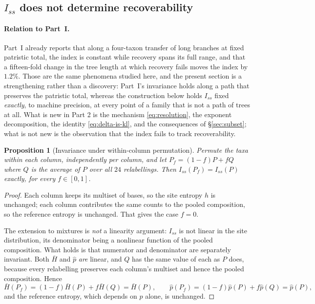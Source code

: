 \documentclass[preprint,12pt,authoryear]{elsarticle}
\newcommand{\Iss}{I_{ss}}
\newcommand{\Hbar}{\bar H}
\newtheorem{proposition}[theorem]{Proposition}
\theoremstyle{definition}
\theoremstyle{remark}
\begin{document}
\subsection{$\Iss$ does not determine recoverability}
\label{sec:shuffle}

\paragraph{Relation to Part~I.} Part~I
\citep{xu2026preprint} already reports that along a four-taxon transfer of
long branches at fixed patristic total, the index is constant while recovery
spans its full range, and that a fifteen-fold change in the tree length at
which recovery fails moves the index by $1.2\%$. Those are the same
phenomena studied here, and the present section is a strengthening rather
than a discovery: Part~I's invariance holds along a path that
preserves the patristic total, whereas the construction below holds $\Iss$
fixed \emph{exactly}, to machine precision, at every point of a family that
is not a path of trees at all. What is new in Part 2 is the mechanism
\eqref{eq:resolution}, the exponent decomposition, the identity
\eqref{eq:delta-is-kl}, and the consequences of \S\ref{sec:subset}; what is
not new is the observation that the index fails to track recoverability.

\begin{proposition}[Invariance under within-column permutation]
\label{prop:shuffle}
Permute the taxa \emph{within each column}, independently per column, and let
$P_f=(1-f)P+fQ$ where $Q$ is the average of $P$ over all $24$ relabellings.
Then $\Iss(P_f)=\Iss(P)$ exactly, for every $f\in[0,1]$.
\end{proposition}

\begin{proof}
Each column keeps its multiset of bases, so the site entropy $h$ is unchanged;
each column contributes the same counts to the pooled composition, so the
reference entropy is unchanged. That gives the case $f=0$.

The extension to mixtures is \emph{not} a linearity argument: $\Iss$ is not
linear in the site distribution, its denominator being a nonlinear function of
the pooled composition. What holds is that numerator and denominator are
separately invariant. Both $\Hbar$ and $\hat p$ \emph{are} linear, and
$Q$ has the same value of each as $P$ does, because every relabelling
preserves each column's multiset and hence the pooled composition. Hence
\begin{equation}
\Hbar(P_f)=(1-f)\Hbar(P)+f\Hbar(Q)=\Hbar(P),\qquad
\hat p(P_f)=(1-f)\hat p(P)+f\hat p(Q)=\hat p(P),
\end{equation}
and the reference entropy, which depends on $\hat p$ alone, is unchanged.
\end{proof}
\end{document}
